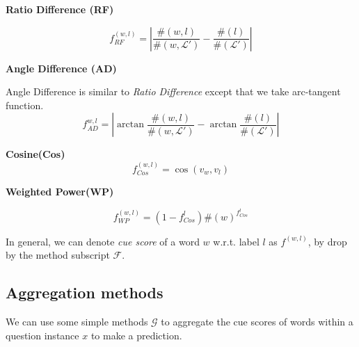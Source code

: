\noindent\textbf{Ratio Difference (RF)}

\begin{equation}
    f_{RF}^{(w,l)} = \left|\frac{\#(w, l)}{\#(w, \mathcal{L'})} -
    \frac{\#(l)}{\#(\mathcal{L'})}\right|
\end{equation}

\noindent\textbf{Angle Difference (AD)}

Angle Difference is similar to \textit{Ratio Difference} except that we take arc-tangent function.
\begin{equation}
    f_{AD}^{w,l} = \left| \arctan\frac{\#(w, l)}{\#(w, \mathcal{L'})} -
    \arctan \frac{\#(l)}{\#(\mathcal{L'})} \right|
\end{equation}

\noindent\textbf{Cosine(Cos)}
\begin{equation}
    f_{Cos}^{(w,l)} = \cos(v_w, v_l)
\end{equation}

\noindent\textbf{Weighted Power(WP)}

\begin{equation}
    f_{WP}^{(w,l)} = (1-f_{Cos}^{l})\#(w)^{f_{Cos}^{l}}
\end{equation}

In general, we can denote \textit{cue score} of a word $w$ w.r.t. label $l$ as
$f^{(w,l)}$, by drop by the method subscript $\mathcal{F}$. 

\subsection{Aggregation methods}

We can use some simple methods $\mathcal{G}$ to aggregate the cue scores of words within
a question instance $x$ to make a prediction.

